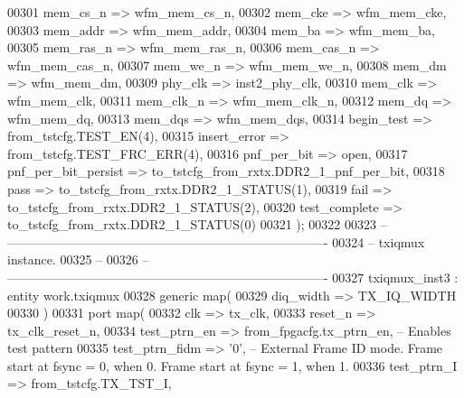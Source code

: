 \begin{DoxyCode}
00301       mem_cs_n                => wfm_mem_cs_n,
00302       mem_cke                 => wfm_mem_cke,
00303       mem_addr                => wfm_mem_addr,
00304       mem_ba                  => wfm_mem_ba,
00305       mem_ras_n               => wfm_mem_ras_n,
00306       mem_cas_n               => wfm_mem_cas_n,
00307       mem_we_n                => wfm_mem_we_n,
00308       mem_dm                  => wfm_mem_dm,
00309       phy_clk                 => inst2_phy_clk,
00310       mem_clk                 => wfm_mem_clk,
00311       mem_clk_n               => wfm_mem_clk_n,
00312       mem_dq                  => wfm_mem_dq,
00313       mem_dqs                 => wfm_mem_dqs,
00314       begin_test              => from\_tstcfg.TEST\_EN\textcolor{vhdlchar}{(}\textcolor{vhdllogic}{4}\textcolor{vhdlchar}{)},
00315       insert_error            => from\_tstcfg.TEST\_FRC\_ERR\textcolor{vhdlchar}{(}\textcolor{vhdllogic}{4}\textcolor{vhdlchar}{)},
00316       pnf_per_bit             => \textcolor{keywordflow}{open},
00317       pnf_per_bit_persist     => to\_tstcfg\_from\_rxtx.DDR2\_1\_pnf\_per\_bit,
00318       pass                    => to\_tstcfg\_from\_rxtx.DDR2\_1\_STATUS\textcolor{vhdlchar}{(}\textcolor{vhdllogic}{1}\textcolor{vhdlchar}{)},
00319       fail                    => to\_tstcfg\_from\_rxtx.DDR2\_1\_STATUS\textcolor{vhdlchar}{(}\textcolor{vhdllogic}{2}\textcolor{vhdlchar}{)},
00320       test_complete           => to\_tstcfg\_from\_rxtx.DDR2\_1\_STATUS\textcolor{vhdlchar}{(}\textcolor{vhdllogic}{0}\textcolor{vhdlchar}{)}
00321    \textcolor{vhdlchar}{)};
00322       
00323 \textcolor{keyword}{-- ----------------------------------------------------------------------------}
00324 \textcolor{keyword}{-- txiqmux instance.}
00325 \textcolor{keyword}{-- }
00326 \textcolor{keyword}{-- ----------------------------------------------------------------------------       }
00327    txiqmux\_inst3 : \textcolor{keywordflow}{entity} work.txiqmux
00328    \textcolor{keywordflow}{generic} \textcolor{keywordflow}{map}(
00329       diq_width   => TX_IQ_WIDTH
00330    \textcolor{vhdlchar}{)}
00331    \textcolor{keywordflow}{port} \textcolor{keywordflow}{map}(
00332       clk               => tx_clk,
00333       reset_n           => tx_clk_reset_n,
00334       test_ptrn_en      => from\_fpgacfg.tx\_ptrn\_en,\textcolor{keyword}{   -- Enables test pattern}
00335       test_ptrn_fidm    => '0',\textcolor{keyword}{   -- External Frame ID mode. Frame start at fsync = 0, when 0. Frame start
       at fsync = 1, when 1.}
00336       test_ptrn_I       => from\_tstcfg.TX\_TST\_I,

\end{DoxyCode}
